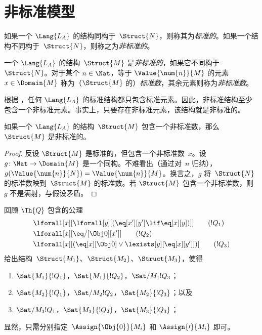\documentclass[../../../include/open-logic-section]{subfiles}
\begin{document}
\section{非标准模型}

\begin{explain}
如果一个 $\Lang{L_A}$ 的结构同构于~$\Struct{N}$，则称其为\emph{标准的}。如果一个结构不同构于~$\Struct{N}$，则称之为\emph{非标准的}。
\end{explain}

\begin{defn}
一个 $\Lang{L_A}$ 的结构~$\Struct{M}$ 是\emph{非标准的}，如果它不同构于~$\Struct{N}$。对于某个 $n \in \Nat$，等于 $\Value{\num{n}}{M}$ 的元素 $x \in \Domain{M}$ 称为（$\Struct{M}$ 的）\emph{标准数}，其余元素则称为\emph{非标准数}。
\end{defn}

\begin{explain}
根据 ，任何 $\Lang{L_A}$ 的标准结构都只包含标准元素。因此，非标准结构至少包含一个非标准元素。事实上，只要存在非标准元素，该结构就是非标准的。
\end{explain}

\begin{prop}
如果一个 $\Lang{L_A}$ 的结构~$\Struct{M}$ 包含一个非标准数，那么 $\Struct{M}$ 是非标准的。
\end{prop}

\begin{proof}
反设 $\Struct{M}$ 是标准的，但包含一个非标准数~$x$。设 $g\colon \Nat \to \Domain{M}$ 是一个同构。不难看出（通过对~$n$ 归纳），$g(\Value{\num{n}}{N}) = \Value{\num{n}}{M}$。换言之，$g$ 将~$\Struct{N}$ 的标准数映到~$\Struct{M}$ 的标准数。若 $\Struct{M}$ 包含一个非标准数，则 $g$ 不是满射，与假设矛盾。
\end{proof}

\begin{prob}
回顾 $\Th{Q}$ 包含的公理
\begin{align*}
& \lforall[x][\lforall[y][(\eq[x'][y'] \lif \eq[x][y])]] \tag{$!Q_1$}\\
& \lforall[x][\eq/[\Obj 0][x']] \tag{$!Q_2$}\\
& \lforall[x][(\eq[x][\Obj 0] \lor \lexists[y][\eq[x][y']])] \tag{$!Q_3$}
\end{align*}
给出结构~$\Struct{M_1}$、$\Struct{M_2}$、$\Struct{M_3}$，使得
\begin{enumerate}
\item $\Sat{M_1}{!Q_1}$，$\Sat{M_1}{!Q_2}$，$\Sat/{M_1}{!Q_3}$；
\item $\Sat{M_2}{!Q_1}$，$\Sat/{M_2}{!Q_2}$，$\Sat{M_2}{!Q_3}$；以及
\item $\Sat/{M_3}{!Q_1}$，$\Sat{M_3}{!Q_2}$，$\Sat{M_3}{!Q_3}$；
\end{enumerate}
显然，只需分别指定~$\Assign{\Obj{0}}{M_i}$ 和 $\Assign{\prime}{M_i}$ 即可。
\end{prob}
\end{document}
